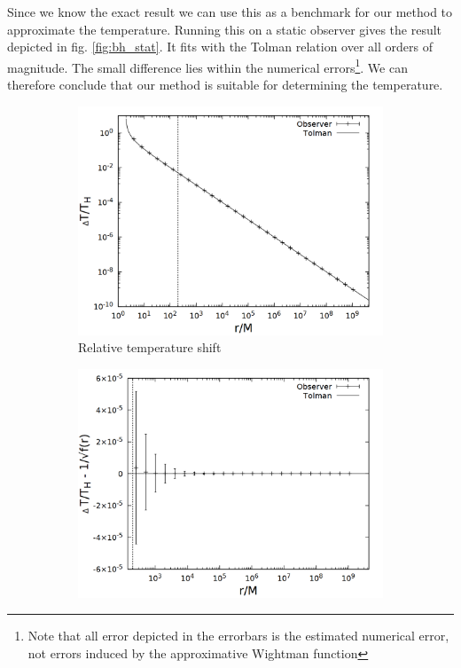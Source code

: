 Since we know the exact result we can use this as a benchmark for our method to approximate the temperature. Running this on a static observer  gives the result depicted in fig. \ref{fig:bh_stat}. It fits with the Tolman relation over all orders of magnitude. The small difference lies within the numerical errors\footnote{Note that all error depicted in the errorbars is the estimated numerical error, not errors induced by the approximative Wightman function}. We can therefore conclude that our method is suitable for determining the temperature. 

\begin{figure}[h]
  \centering
  \begin{subfigure}[h]{0.5\textwidth}
    \centering
    \includegraphics[width=\textwidth]{cpp/final/stat.png}
    \caption{Relative temperature shift}
  \end{subfigure}%
  \begin{subfigure}[h]{0.5\textwidth}
    \centering
    \includegraphics[width=\textwidth]{cpp/final/stat_tolman.png}

\end{subfigure}
\end{figure}
